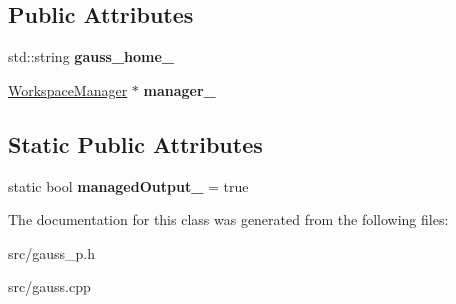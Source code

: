 \subsection*{Public Attributes}
\begin{DoxyCompactItemize}
\item 
\hypertarget{class_g_a_u_s_s_private_a679967c9cf82d210bbd1a9175fabbf39}{std\-::string {\bfseries gauss\-\_\-home\-\_\-}}\label{class_g_a_u_s_s_private_a679967c9cf82d210bbd1a9175fabbf39}

\item 
\hypertarget{class_g_a_u_s_s_private_a958b83efb05a1823eeb4e5f577767131}{\hyperlink{class_workspace_manager}{Workspace\-Manager} $\ast$ {\bfseries manager\-\_\-}}\label{class_g_a_u_s_s_private_a958b83efb05a1823eeb4e5f577767131}

\end{DoxyCompactItemize}
\subsection*{Static Public Attributes}
\begin{DoxyCompactItemize}
\item 
\hypertarget{class_g_a_u_s_s_private_aa4f61f8c75eddfacb6a12cc77ac1c502}{static bool {\bfseries managed\-Output\-\_\-} = true}\label{class_g_a_u_s_s_private_aa4f61f8c75eddfacb6a12cc77ac1c502}

\end{DoxyCompactItemize}


The documentation for this class was generated from the following files\-:\begin{DoxyCompactItemize}
\item 
src/gauss\-\_\-p.\-h\item 
src/gauss.\-cpp\end{DoxyCompactItemize}
